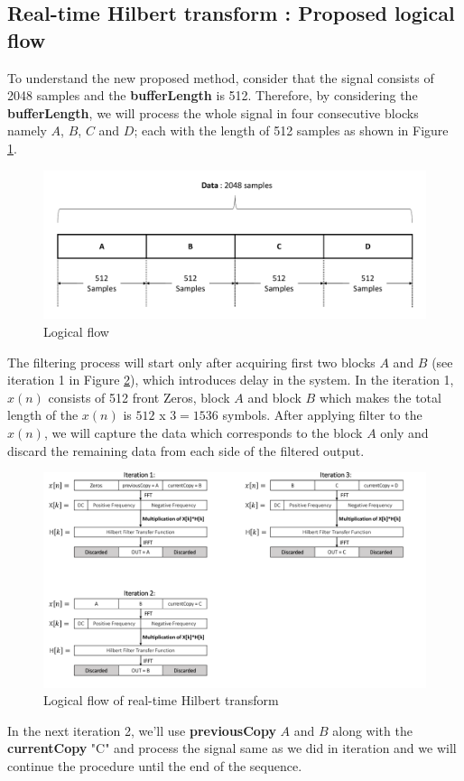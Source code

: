 \subsection*{Real-time Hilbert transform : Proposed logical flow}
To understand the new proposed method, consider that the signal consists of 2048 samples and the \textbf{bufferLength} is 512. Therefore, by considering the \textbf{bufferLength}, we will process the whole signal in four consecutive blocks namely $A$, $B$, $C$ and $D$; each with the length of 512 samples as shown in Figure \ref{data}.
\begin{figure}[h]
	\centering
	\includegraphics[width=14cm]{./algorithms/hilbert/figures/data.pdf}
	\caption{Logical flow}
	\label{data}
\end{figure}
The filtering process will start only after acquiring first two blocks $A$ and $B$ (see iteration 1 in Figure \ref{Logical flow}), which introduces delay in the system. In the iteration 1, $x(n)$ consists of 512 front Zeros, block $A$ and block $B$ which makes the total length of the $x(n)$ is $512$ x $3 = 1536$ symbols. After applying filter to the $x(n)$, we will capture the data which corresponds to the block $A$ only and discard the remaining data from each side of the filtered output.\\
\begin{figure}[h]
	\centering
	\includegraphics[width=14cm]{./algorithms/hilbert/figures/proposedLogic.pdf}
	\caption{Logical flow of real-time Hilbert transform}
	\label{Logical flow}
\end{figure}
In the next iteration 2, we'll use \textbf{previousCopy} $A$ and $B$ along with the \textbf{currentCopy} "C" and process the signal same as we did in iteration  and we will continue the procedure until the end of the sequence.
